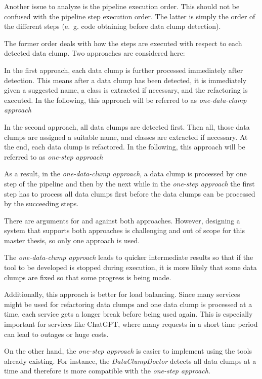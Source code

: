 Another issue to analyze is the pipeline execution order. This should not be confused with the pipeline step execution order. The latter is simply the order of the different steps (e.~g. code obtaining before data clump detection). 

The former order deals with how the steps are executed with respect to each detected data clump. Two approaches are considered here:

In the first approach, each data clump is  further processed immediately after detection. This means after a data clump has been detected, it is immediately given a suggested name, a class is extracted if necessary, and the refactoring is executed. In the following, this approach will be referred to as \textit{one-data-clump approach}

In the second approach, all data clumps are detected first. Then all, those data clumps are assigned a suitable name, and classes are extracted if necessary. At the end, each data clump is refactored. In the following, this approach will be referred to as \textit{one-step approach}

As a result, in the \textit{one-data-clump approach}, a data clump is processed by one step of the pipeline and then by the next while in the \textit{one-step approach} the first step has to process all data clumps first before the data clumps can be processed by the succeeding steps.

There are arguments for and against both approaches. However, designing a system that supports both approaches is challenging and out of scope for this master thesis, so only one approach is used. 

The \textit{one-data-clump approach} leads to quicker intermediate results so that if the tool to be developed is stopped during execution, it is more likely that some data clumps are fixed so that some progress is being made.

Additionally, this approach is better for load balancing. Since many services might be used for refactoring data clumps and one data clump is processed at a time, each service gets a longer break before being used again. This is  especially important for services like ChatGPT, where many requests in a short time period can lead to outages or huge costs. 

On the other hand, the \textit{one-step approach} is easier to implement using the tools already existing. For instance, the \textit{DataClumpDoctor} detects all data clumps at a time and therefore is more compatible with the \textit{one-step approach}.

